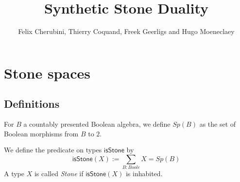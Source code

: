 \documentclass{../util/zariski-small}
\title{Synthetic Stone Duality}
\begin{document}
\author{Felix Cherubini, Thierry Coquand, Freek Geerligs and Hugo Moeneclaey}

\maketitle

%
\section{Stone spaces}
\newcommand{\isSt}{\mathsf{isStone}}
\subsection{Definitions}
\begin{definition}
  For $B$ a countably presented Boolean algebra, we define $Sp(B)$ as the set of Boolean morphisms from $B$ to $2$. 
\end{definition}
\begin{definition}
  We define the predicate on types $\isSt$ by 
  \begin{equation}
    \isSt(X) := \sum\limits_{B : Boole} X = Sp(B)
  \end{equation} 
  A type $X$ is called \textit{Stone} if $\isSt(X)$ is inhabited.
\end{definition}
\end{document}
